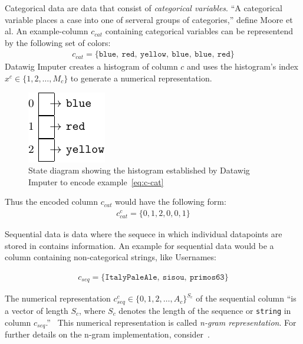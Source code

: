 Categorical data are data that consist of \emph{categorical variables}.
``A categorical variable places a case into one of serveral groups of categories,{''} define Moore et al.\cite[p.~4]{MOO11}
An example-column \( c_{cat} \) containing categorical variables can be representend by the following set of colors:
\begin{align}\label{eq:c-cat}
    c_{cat} = \{ \texttt{blue},~\texttt{red},~\texttt{yellow},~\texttt{blue},~\texttt{blue},~\texttt{red} \}
\end{align}
Datawig Imputer creates a histogram of column \( c \) and uses the histogram's index \( x^c \in \{1, 2, \dots, M_c \} \) to generate a numerical representation.
\begin{figure}[ht]
    \centering
    \includegraphics[width=.3\textwidth]{images/state_diagrams/color_histogram}
    \caption{State diagram showing the histogram established by Datawig Imputer to encode example~\ref{eq:c-cat}}
    \label{fig:state-diagram-color}
\end{figure}
Thus the encoded column \( c_{cat} \) would have the following form:
\begin{align*}
    c_{cat}^{c} = \{ 0, 1, 2, 0, 0, 1\}
\end{align*}

Sequential data is data where the sequece in which individual datapoints are stored in contains information.
An example for sequential data would be a column containing non-categorical strings, like Usernames:

\begin{align*}
    c_{seq} = \{ \texttt{ItalyPaleAle},~\texttt{sisou},~\texttt{primos63} \}
\end{align*}

The numerical representation \( c_{seq}^{c} \in \{ 0, 1, 2, \dots, A_c \}^{S_c} \) of the sequential column ``is a vector of length \( S_c \), where \( S_c \) denotes the length of the sequence or \texttt{string} in column \( c_{seq} \).''~\cite[p.~2020]{BIE18}
This numerical representation is called \emph{n-gram representation}.
For further details on the n-gram implementation, consider~\cite[p.~2020]{BIE18}.

